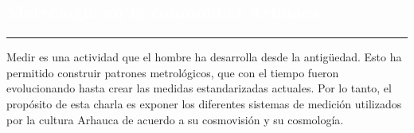 \begin{titlepage}
\pagecolor{white}
\newcommand{\R}{\ensuremath{\mathbb{R}}}
\BgThispage
{}
\vspace*{-1.1cm}
\noindent
\def\titulo#1{\section{#1}}

\section{\bf\large\textcolor{white}{Metrolog\'ia en la comunidad Arhuaca}}
\vspace*{2cm}\par
\noindent

\begin{minipage}{0.5\linewidth}
\begin{minipage}{0.45\linewidth}
    \begin{flushright}
        \printauthor
    \end{flushright}
\end{minipage} \hspace{-3pt}
%
\begin{minipage}{0.02\linewidth}
   \color{ptctitle} \rule{1pt}{245pt}
\end{minipage} 
\end{minipage}
\hspace*{-4.5cm}
\begin{minipage}{0.85\linewidth}
\begin{minipage}{0.85\linewidth}
\footnotesize
\vspace{5pt}
    \begin{resumen}
   Medir es una actividad que el hombre ha desarrolla desde la antig\"uedad. Esto ha permitido construir patrones metrol\'ogicos, que con el tiempo fueron evolucionando hasta crear las medidas estandarizadas actuales. Por lo tanto, el prop\'osito de esta charla es exponer los diferentes sistemas de medici\'on utilizados por la cultura Arhauca de acuerdo a su cosmovisi\'on y su cosmolog\'ia. 
      \end{resumen}
\end{minipage}
\vspace*{5pt}\\
\footnotesize
%  
    

\end{minipage}
\end{titlepage}
